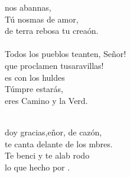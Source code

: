 \begin{cancion}
	 nos abannas, \\
	Tú nosmas de amor,\\
	de terra rebosa tu creaón.\\
\jump\\
	Todos los pueblos teanten, Señor!\\
	que proclamen tusaravillas!\\
	es con los huldes \\
	Túmpre estarás,\\
	eres  Camino y la Verd.\\\jump\\
	\begin{chorus}%
	 doy gracias,eñor, de cazón,\\
	te canta delante de los mbres. \\
	Te benci y te alab rodo \\
	lo que  hecho por . \\
	\end{chorus}%
	\jump\\
\end{cancion}%
